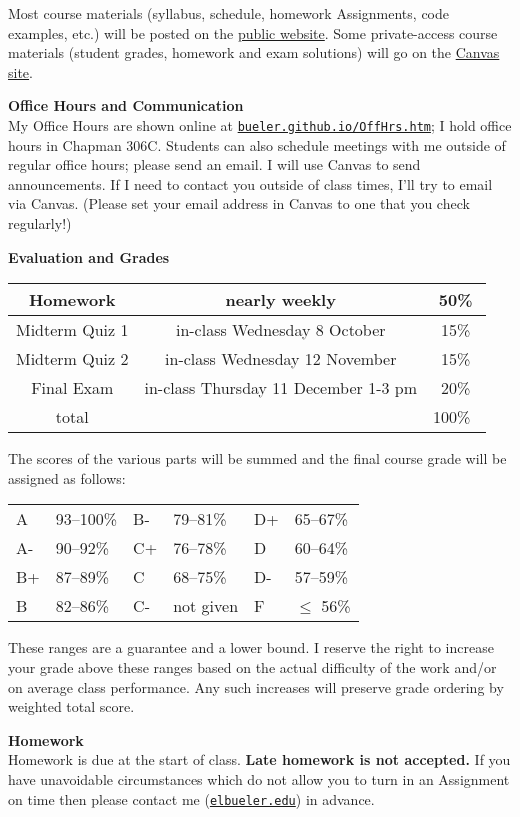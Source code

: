 \documentclass[12pt]{article}
\renewcommand{\emph}[1]{\textsf{\textbf{#1}}}
\newcommand{\localhead}[1]{\par\smallskip\textbf{#1} \smallskip\nobreak\\}%
\def\heading#1{\localhead{\large\emph{#1}}}
\begin{document}
Most course materials (syllabus, schedule, homework Assignments, code examples, etc.) will be posted on the \href{https://bueler.github.io/nla/}{public website}.  Some private-access course materials (student grades, homework and exam solutions) will go on the \href{https://canvas.alaska.edu/courses/27130}{Canvas site}.


\heading{Office Hours and Communication}
My Office Hours are shown online at \href{http://bueler.github.io/OffHrs.htm}{\texttt{bueler.github.io/OffHrs.htm}}; I hold office hours in Chapman 306C.  Students can also schedule meetings with me outside of regular office hours; please send an email.  I will use Canvas to send announcements.  If I need to contact you outside of class times, I'll try to email via Canvas.  (Please set your email address in Canvas to one that you check regularly!)


\clearpage\newpage
\phantom{foo}
\heading{Evaluation and Grades}
\vskip -10pt

\begin{tabular}{|c|c|c|}
\hline
Homework & nearly weekly & 50\% \\
\hline
Midterm Quiz 1 & in-class Wednesday 8 October  & 15\%  \\
\hline
Midterm Quiz 2 & in-class Wednesday 12 November & 15\%  \\
\hline
Final Exam     & in-class Thursday 11 December 1-3 pm & 20\% \\
\hline
total & & 100\% \, \\
\hline
\end{tabular}

The scores of the various parts will be summed and the final course grade will be assigned as follows:

\begin{tabular}{llllll}
A  & 93--100\% & B- & 79--81\%  & D+ & 65--67\%  \\
A- & 90--92\%  & C+ & 76--78\%  & D  & 60--64\%  \\
B+ & 87--89\%  & C  & 68--75\%  & D- & 57--59\%  \\
B  & 82--86\%  & C- & not given & F  & $\le$ 56\%
\end{tabular}

These ranges are a guarantee and a lower bound.  I reserve the right to increase your grade above these ranges based on the actual difficulty of the work and/or on average class performance.  Any such increases will preserve grade ordering by weighted total score.


\heading{Homework}
Homework is due at the start of class.  \emph{Late homework is not accepted.}  If you have unavoidable circumstances which do not allow you to turn in an Assignment on time then please contact me (\href{mailto:elbueler@alaska.edu}{\texttt{elbueler\@@alaska.edu}}) in advance.
\end{document}
